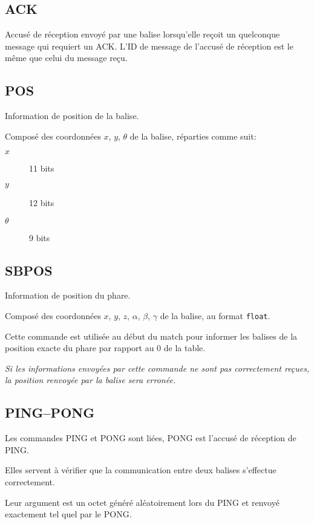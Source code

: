 \subsection{ACK}
	\label{subsec:t:ACK}

	Accusé de réception envoyé par une balise lorsqu'elle reçoit un quelconque message qui requiert un ACK.
	L'ID de message de l'accusé de réception est le même que celui du message reçu.

\subsection{POS}
	\label{subsec:t:POS}

	Information de position de la balise.

	Composé des coordonnées $x$, $y$, $\theta$ de la balise, réparties comme suit:

	\begin{description}
		\item[$x$] 11 bits
		\item[$y$] 12 bits
		\item[$\theta$] 9 bits
	\end{description}

\subsection{SBPOS}
	\label{subsec:t:SBPOS}

	Information de position du phare.

	Composé des coordonnées $x$, $y$, $z$, $\alpha$, $\beta$, $\gamma$ de la balise, au format \verb|float|.

	Cette commande est utilisée au début du match pour informer les balises de la position exacte du phare par rapport au $0$ de la table.

	\emph{Si les informations envoyées par cette commande ne sont pas correctement reçues, la position renvoyée par la balise sera erronée.}

\subsection{PING--PONG}
	\label{subsec:t:PING-PONG}

	Les commandes PING et PONG sont liées, PONG est l'accusé de réception de PING.

	Elles servent à vérifier que la communication entre deux balises s'effectue correctement.

	Leur argument est un octet généré aléatoirement lors du PING et renvoyé exactement tel quel par le PONG.

